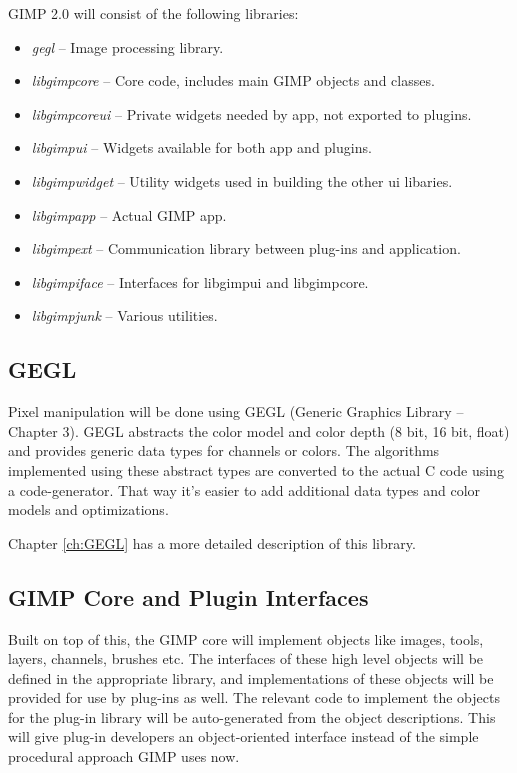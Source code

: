 GIMP 2.0 will consist of the following libraries: 
\begin{itemize}
\item {\em gegl} -- Image processing library. 
\item {\em libgimpcore} -- Core code, includes main GIMP objects and classes.  
\item {\em libgimpcoreui} -- Private widgets needed by app, not exported to plugins. 
\item {\em libgimpui} -- Widgets available for both app and plugins. 
\item {\em libgimpwidget} -- Utility widgets used in building the other ui libaries. 
\item {\em libgimpapp} -- Actual GIMP app.
\item {\em libgimpext} -- Communication library between plug-ins and application.
\item {\em libgimpiface} -- Interfaces for libgimpui and libgimpcore.
\item {\em libgimpjunk} -- Various utilities. 
\end{itemize}

\subsection{GEGL}

Pixel manipulation will be done using GEGL (Generic Graphics Library -- Chapter
3). GEGL abstracts the color model and color depth (8 bit, 16 bit, float) and
provides generic data types for channels or colors.  The algorithms implemented
using these abstract types are converted to the actual C code using a
code-generator. That way it's easier to add additional data types and color
models and optimizations.

Chapter
\ref{ch:GEGL} has a more detailed description of this library.

\subsection{GIMP Core and Plugin Interfaces}

Built on top of this, the GIMP core will implement objects like images, tools,
layers, channels, brushes etc. The interfaces of these high level objects will
be defined in the appropriate library, and implementations of these objects
will be provided for use by plug-ins as well. The relevant code to implement
the objects for the plug-in library will be auto-generated from the object
descriptions.  This will give plug-in developers an object-oriented interface
instead of the simple procedural approach GIMP uses now.

